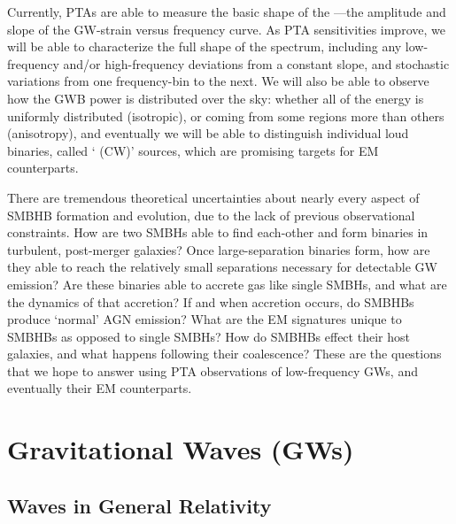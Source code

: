 \documentclass[onecolumn,authoryear]{els-mrw}
\begin{document}
Currently, PTAs are able to measure the basic shape of the ---the amplitude and slope of the GW-strain versus frequency curve.  As PTA sensitivities improve, we will be able to characterize the full shape of the spectrum, including any low-frequency and/or high-frequency deviations from a constant slope, and stochastic variations from one frequency-bin to the next.  We will also be able to observe how the GWB power is distributed over the sky: whether all of the energy is uniformly distributed (isotropic), or coming from some regions more than others (anisotropy), and eventually we will be able to distinguish individual loud binaries, called ` (CW)' sources, which are promising targets for EM counterparts.

There are tremendous theoretical uncertainties about nearly every aspect of SMBHB formation and evolution, due to the lack of previous observational constraints.  How are two SMBHs able to find each-other and form binaries in turbulent, post-merger galaxies?  Once large-separation binaries form, how are they able to reach the relatively small separations necessary for detectable GW emission?  Are these binaries able to accrete gas like single SMBHs, and what are the dynamics of that accretion?  If and when accretion occurs, do SMBHBs produce `normal' AGN emission?  What are the EM signatures unique to SMBHBs as opposed to single SMBHs?  How do SMBHBs effect their host galaxies, and what happens following their coalescence?  These are the questions that we hope to answer using PTA observations of low-frequency GWs, and eventually their EM counterparts.



\section{Gravitational Waves (GWs)}\label{sec:gws}

\subsection{Waves in General Relativity}\label{sec:gws_gr-waves}

\end{document}
